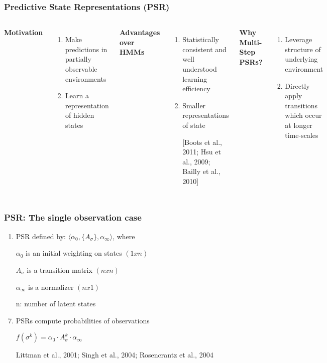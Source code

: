 \documentclass{beamer}
\begin{document}
\begin{frame}
\frametitle{Predictive State Representations (PSR)}
\begin{columns}[c] %

\textbf{Motivation}
\begin{enumerate}
\item Make predictions in partially observable environments 
\item Learn a representation of hidden states
\item[]
\end{enumerate}

\textbf{Advantages over HMMs}
\begin{enumerate}
\item Statistically consistent and well understood learning efficiency
\item Smaller representations of state
\item[] [Boots et al., 2011; Hsu et al., 2009; Bailly et al., 2010]
\item[]

\end{enumerate}

\textbf{Why Multi-Step PSRs?}
\begin{enumerate}
\item Leverage structure of underlying environment
\item Directly apply transitions which occur at longer time-scales 

\end{enumerate}

\end{columns}
\end{frame}


\begin{frame}
\frametitle{PSR: The single observation case}

\begin{enumerate}
\item PSR defined by: $\langle \alpha_0, \{A_\sigma\},\alpha_\infty \rangle$, where
\item[] $\alpha_0$ is an initial weighting on states $(1xn)$
\item[] $A_\sigma$ is a transition matrix $(nxn)$
\item[] $\alpha_\infty$ is a normalizer $(nx1)$
\item[] n: number of latent states
\item[]
\item PSRs compute probabilities of observations
\item[] $f(\sigma^k) = \alpha_0 \cdot A_\sigma^k \cdot \alpha_\infty$
\item[]
\item[] Littman et al., 2001; Singh et al., 2004; Rosencrantz et al., 2004

\end{enumerate}

\end{frame}
\end{document}
